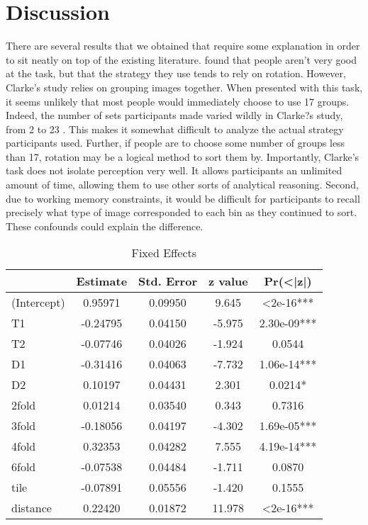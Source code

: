 \section{Discussion}
There are several results that we obtained that require some explanation in order to sit neatly on top of the existing literature. \citet{clarke} found that people aren't very good at the task, but that the strategy they use tends to rely on rotation. However, Clarke's study relies on grouping images together. When presented with this task, it seems unlikely that most people would immediately choose to use 17 groups. Indeed, the number of sets participants made varied wildly in Clarke?s study, from 2 to 23 \citep{clarke}. This makes it somewhat difficult to analyze the actual strategy participants used. Further, if people are to choose some number of groups less than 17, rotation may be a logical method to sort them by. Importantly, Clarke's task does not isolate perception very well. It allows participants an unlimited amount of time, allowing them to use other sorts of analytical reasoning. Second, due to working memory constraints, it would be difficult for participants to recall precisely what type of image corresponded to each bin as they continued to sort. These confounds could explain the difference.

\begin{table}
\centering
\begin{tabular}{|l|cccc|}
\hline
& Estimate & Std. Error & z value & Pr(<|z|)  \\ \hline
(Intercept) & 0.95971 &  0.09950 & 9.645 & <2e-16*** \\ \hline
T1 & -0.24795 &  0.04150 & -5.975 & 2.30e-09*** \\ \hline
T2 & -0.07746 & 0.04026 & -1.924 & 0.0544 \\ \hline
D1 & -0.31416 & 0.04063 & -7.732 & 1.06e-14*** \\ \hline
D2 & 0.10197 & 0.04431 & 2.301 & 0.0214* \\ \hline
2fold & 0.01214 & 0.03540 & 0.343 & 0.7316 \\ \hline
3fold & -0.18056 & 0.04197 & -4.302 & 1.69e-05*** \\ \hline
4fold & 0.32353 & 0.04282 & 7.555 & 4.19e-14*** \\ \hline
6fold & -0.07538 & 0.04484 & -1.711 & 0.0870 \\ \hline
tile & -0.07891 & 0.05556 & -1.420 & 0.1555 \\ \hline
distance & 0.22420 & 0.01872 & 11.978 & <2e-16*** \\ \hline
\end{tabular}
\label{fixeff}
\caption{Fixed Effects}
\end{table}

